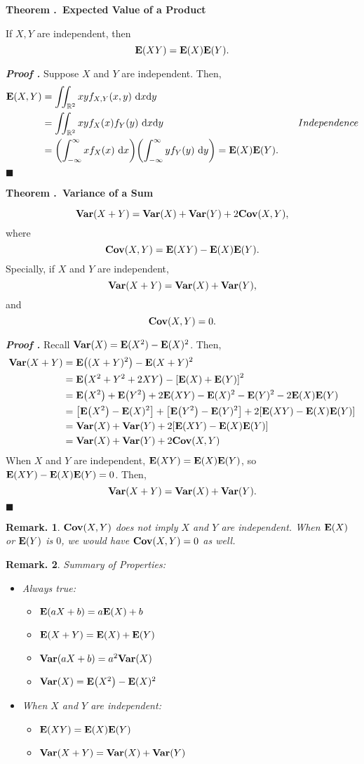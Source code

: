 \documentclass[12pt, a4paper]{article}
\newcounter{index}[subsection]
\newenvironment*{thm}[1]{\begin{tcolorbox}\par\noindent\textbf{Theorem \thesubsection.\stepcounter{index}\theindex\ #1} \par}{\par\end{tcolorbox}}
\newcounter{nprf}[subsection]
\newenvironment*{prf}{\par\indent\textbf{\textit{Proof \stepcounter{nprf}\thenprf.}}}{\hfill$\blacksquare$\par}
\newtheorem*{rmk}{Remark.}
\def\R{\mathbb{R}}
\def\d{\mathrm{d}}
\def\E{\vb{E}}
\def\Var{\vb{Var}}
\def\Cov{\vb{Cov}}
\begin{document}
\begin{thm}{Expected Value of a Product}
	If $X,Y$ are independent, then \[\E(XY)=\E(X)\E(Y).\]
\end{thm}
\begin{prf}
	Suppose $X$ and $Y$ are independent. Then, \begin{align*}\E(X,Y)&=\iint_{\R^2}xyf_{X,Y}(x,y)\ \d{x}\d{y}\\&=\iint_{\R^2}xyf_X(x)f_Y(y)\ \d{x}\d{y}&\quad Independence\\&=\qty(\int_{-\infty}^\infty xf_X(x)\ \d{x})\qty(\int_{-\infty}^\infty yf_Y(y)\ \d{y})=\E(X)\E(Y).\end{align*}	
\end{prf}
\begin{thm}{Variance of a Sum}
	\[\Var(X+Y)=\Var(X)+\Var(Y)+2\Cov(X,Y),\] where \[\Cov(X,Y)=\E(XY)-\E(X)\E(Y).\] Specially, if $X$ and $Y$ are independent, \[\Var(X+Y)=\Var(X)+\Var(Y),\] and \[\Cov(X,Y)=0.\]
\end{thm}
\begin{prf}
	Recall $\Var(X)=\E(X^2)-\E(X)^2$. Then, \begin{align*}\Var(X+Y)&=\E\qty((X+Y)^2)-\E(X+Y)^2\\&=\E\qty(X^2+Y^2+2XY)-\qty[\E(X)+\E(Y)]^2\\&=\E\qty(X^2)+\E\qty(Y^2)+2\E(XY)-\E(X)^2-\E(Y)^2-2\E(X)\E(Y)\\&=\qty[\E\qty(X^2)-\E(X)^2]+\qty[\E\qty(Y^2)-\E(Y)^2]+2\qty[\E(XY)-\E(X)\E(Y)]\\&=\Var(X)+\Var(Y)+2\qty[\E(XY)-\E(X)\E(Y)]\\&=\Var(X)+\Var(Y)+2\Cov(X,Y)\end{align*} When $X$ and $Y$ are independent, $\E(XY)=\E(X)\E(Y)$, so $\E(XY)-\E(X)\E(Y)=0$. Then, \[\Var(X+Y)=\Var(X)+\Var(Y).\]
\end{prf}
\begin{rmk}
	$\Cov(X,Y)$ does not imply $X$ and $Y$ are independent. When $\E(X)$ or $\E(Y)$ is $0$, we would have $\Cov(X,Y)=0$ as well. 	
\end{rmk}
\begin{rmk}
	Summary of Properties: 
	\begin{itemize}
		\item Always true: 
		\begin{itemize}
			\item $\E(aX+b)=a\E(X)+b$
			\item $\E(X+Y)=\E(X)+\E(Y)$
			\item $\Var(aX+b)=a^2\Var(X)$
			\item $\Var(X)=\E\qty(X^2)-\E(X)^2$
		\end{itemize}
		\item When $X$ and $Y$ are independent: 
		\begin{itemize}
			\item $\E(XY)=\E(X)\E(Y)$
			\item $\Var(X+Y)=\Var(X)+\Var(Y)$
		\end{itemize}
	\end{itemize}	
\end{rmk}
\end{document}
